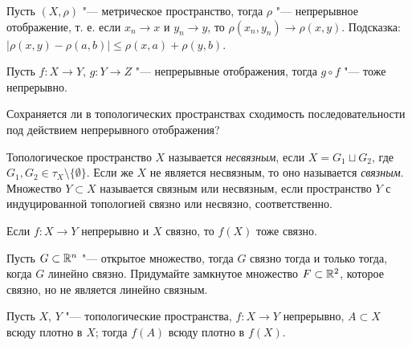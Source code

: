 \documentclass[main]{subfiles}
\begin{document}
\begin{exercise}
  Пусть \( (X, \rho) \) "--- метрическое пространство,
  тогда \( \rho \) "--- непрерывное отображение,
  т. е. если \( x_n \to x \) и \( y_n \to y \),
  то \( \rho(x_n, y_n) \to \rho(x, y) \).
  Подсказка: \( |\rho(x, y) - \rho(a, b)| \le
  \rho(x, a) + \rho(y, b) \).
\end{exercise}

\begin{exercise}
  Пусть \( f : X \to Y \), \( g : Y \to Z \) "--- непрерывные
  отображения, тогда \( g \circ f \) "--- тоже непрерывно.
\end{exercise}

\begin{exercise}
  Сохраняется ли в топологических пространствах сходимость
  последовательности под действием непрерывного отображения?
\end{exercise}

\begin{definition}
  Топологическое пространство \( X \) называется \emph{несвязным},
  если \( X = G_1 \sqcup G_2 \), где
  \( G_1, G_2 \in \tau_X \setminus \{ \emptyset \} \).
  Если же \( X \) не является несвязным, то оно
  называется \emph{связным}. Множество \( Y \subset X \) называется
  связным или несвязным, если пространство
  \( Y \) с индуцированной топологией связно или несвязно,
  соответственно.
\end{definition}

\begin{exercise}
  Если \( f : X \to Y \) непрерывно и \( X \) связно,
  то \( f(X) \) тоже связно.
\end{exercise}

\begin{exercise}
  Пусть \( G \subset \mathbb{R}^n \) "--- открытое множество, тогда
  \( G \) связно тогда и только тогда, когда \( G \)
  линейно связно. Придумайте замкнутое множество \( F \subset \mathbb{R}^2 \),
  которое связно, но не является линейно связным.
\end{exercise}

\begin{exercise}
  Пусть \( X \), \( Y \) "--- топологические пространства,
  \( f : X \to Y \) непрерывно, \( A \subset X \) всюду
  плотно в \( X \); тогда \( f(A) \) всюду плотно в \( f(X) \).
\end{exercise}
\end{document}
